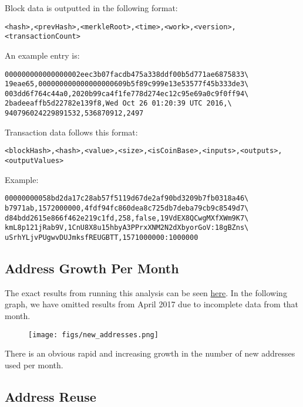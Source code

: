 \documentclass[9pt,twocolumn,twoside]{idsi}
\begin{document}
Block data is outputted in the following format:
\begin{lstlisting}
<hash>,<prevHash>,<merkleRoot>,<time>,<work>,<version>,
<transactionCount>
\end{lstlisting}

An example entry is:
\begin{lstlisting}
000000000000000002eec3b07facdb475a338ddf00b5d771ae6875833\
19eae65,000000000000000000609b5f89c999e13e53577f45b333de3\
003dd6f764c44a0,2020b99ca4f1fe778d274ec12c95e69a0c9f0ff94\
2badeeaffb5d22782e139f8,Wed Oct 26 01:20:39 UTC 2016,\
940796024229891532,536870912,2497
\end{lstlisting}

Transaction data follows this format:
\begin{lstlisting}
<blockHash>,<hash>,<value>,<size>,<isCoinBase>,<inputs>,<outputs>,
<outputValues>
\end{lstlisting}

Example:
\begin{lstlisting}
00000000058bd2da17c28ab57f5119d67de2af90bd3209b7fb0318a46\
b7971ab,1572000000,4fdf94fc860dea8c725db7deba79cb9c8549d7\
d84bdd2615e866f462e219c1fd,258,false,19VdEX8QCwgMXfXWm9K7\
kmL8p121jRab9V,1CnU8X8u15hbyA3PPrxXNM2N2dXbyorGoV:18gBZns\
uSrhYLjvPUgwvDUJmksfREUGBTT,1571000000:1000000
\end{lstlisting}

\subsection{Address Growth Per Month}

The exact results from running this analysis can be seen \href{https://github.com/nishilshah17/idsi_bitcoin/blob/d2f1e0257ff684e99356de052eed1c6868ffe82f/data/output/new_addresses/new_addresses.txt}{here}. In the following graph, we have omitted results from April 2017 due to incomplete data from that month.

\begin{figure}[!ht]
\texttt{[image: figs/new\_addresses.png]}
\end{figure}

There is an obvious rapid and increasing growth in the number of new addresses used per month.

\subsection{Address Reuse}
\end{document}
